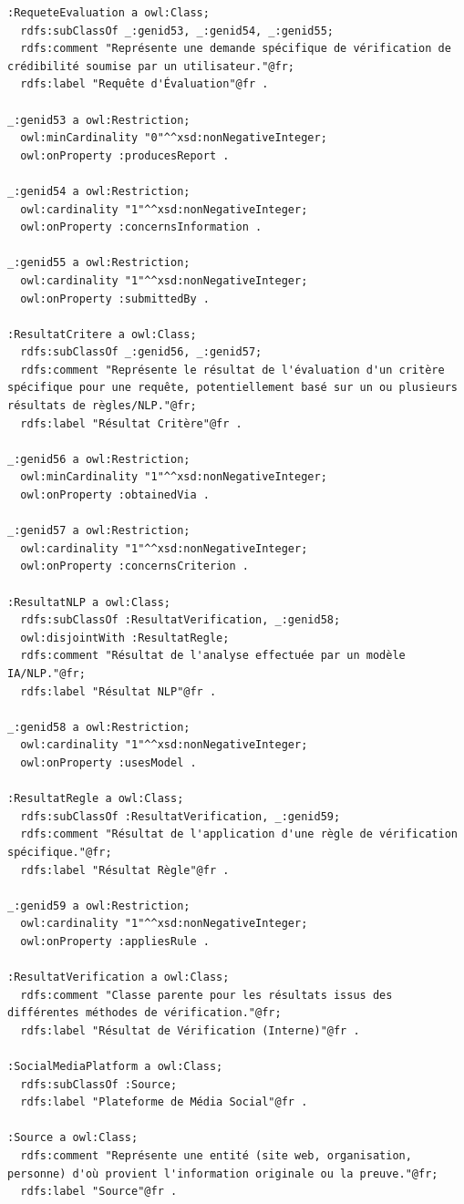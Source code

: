 \documentclass[9pt,twocolumn,french]{article}
\begin{document}
\begin{lstlisting}[language=Turtle,basicstyle=\ttfamily\tiny,frame=single]
:RequeteEvaluation a owl:Class;
  rdfs:subClassOf _:genid53, _:genid54, _:genid55;
  rdfs:comment "Représente une demande spécifique de vérification de crédibilité soumise par un utilisateur."@fr;
  rdfs:label "Requête d'Évaluation"@fr .

_:genid53 a owl:Restriction;
  owl:minCardinality "0"^^xsd:nonNegativeInteger;
  owl:onProperty :producesReport .

_:genid54 a owl:Restriction;
  owl:cardinality "1"^^xsd:nonNegativeInteger;
  owl:onProperty :concernsInformation .

_:genid55 a owl:Restriction;
  owl:cardinality "1"^^xsd:nonNegativeInteger;
  owl:onProperty :submittedBy .

:ResultatCritere a owl:Class;
  rdfs:subClassOf _:genid56, _:genid57;
  rdfs:comment "Représente le résultat de l'évaluation d'un critère spécifique pour une requête, potentiellement basé sur un ou plusieurs résultats de règles/NLP."@fr;
  rdfs:label "Résultat Critère"@fr .

_:genid56 a owl:Restriction;
  owl:minCardinality "1"^^xsd:nonNegativeInteger;
  owl:onProperty :obtainedVia .

_:genid57 a owl:Restriction;
  owl:cardinality "1"^^xsd:nonNegativeInteger;
  owl:onProperty :concernsCriterion .

:ResultatNLP a owl:Class;
  rdfs:subClassOf :ResultatVerification, _:genid58;
  owl:disjointWith :ResultatRegle;
  rdfs:comment "Résultat de l'analyse effectuée par un modèle IA/NLP."@fr;
  rdfs:label "Résultat NLP"@fr .

_:genid58 a owl:Restriction;
  owl:cardinality "1"^^xsd:nonNegativeInteger;
  owl:onProperty :usesModel .

:ResultatRegle a owl:Class;
  rdfs:subClassOf :ResultatVerification, _:genid59;
  rdfs:comment "Résultat de l'application d'une règle de vérification spécifique."@fr;
  rdfs:label "Résultat Règle"@fr .

_:genid59 a owl:Restriction;
  owl:cardinality "1"^^xsd:nonNegativeInteger;
  owl:onProperty :appliesRule .

:ResultatVerification a owl:Class;
  rdfs:comment "Classe parente pour les résultats issus des différentes méthodes de vérification."@fr;
  rdfs:label "Résultat de Vérification (Interne)"@fr .

:SocialMediaPlatform a owl:Class;
  rdfs:subClassOf :Source;
  rdfs:label "Plateforme de Média Social"@fr .

:Source a owl:Class;
  rdfs:comment "Représente une entité (site web, organisation, personne) d'où provient l'information originale ou la preuve."@fr;
  rdfs:label "Source"@fr .


\end{lstlisting}
\end{document}
